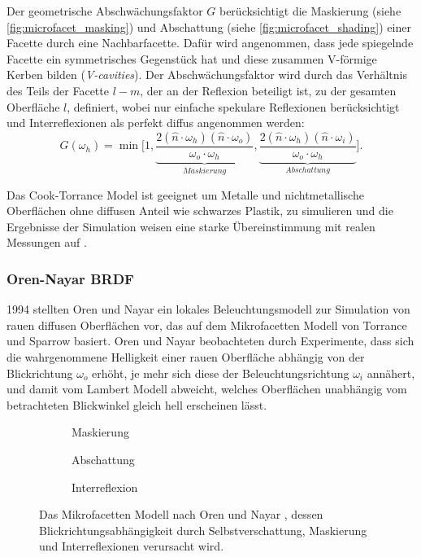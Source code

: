 \documentclass[thesis.tex]{subfiles}
\begin{document}
Der geometrische Abschwächungsfaktor $G$ berücksichtigt die Maskierung (siehe \autoref{fig:microfacet_masking}) und Abschattung (siehe \autoref{fig:microfacet_shading}) einer Facette durch eine Nachbarfacette. Dafür wird angenommen, dass jede spiegelnde Facette ein symmetrisches Gegenstück hat und diese zusammen V-förmige Kerben bilden (\emph{V-cavities}). Der Abschwächungsfaktor wird durch das Verhältnis des Teils der Facette $l-m$, der an der Reflexion beteiligt ist, zu der gesamten Oberfläche $l$, definiert, wobei nur einfache spekulare Reflexionen berücksichtigt und Interreflexionen als perfekt diffus angenommen werden: 
\begin{equation}
G(\omega_h) = \min\Big[1, \underbrace{\frac{2(\hat n \cdot \omega_h)(\hat n \cdot \omega_o)}{\omega_o \cdot \omega_h}}_{Maskierung}, \underbrace{\frac{2(\hat n \cdot \omega_h)(\hat n \cdot \omega_i)}{\omega_o \cdot \omega_h}}_{Abschattung}\Big].
\end{equation}

Das Cook-Torrance Model ist geeignet um Metalle und nichtmetallische Oberflächen ohne diffusen Anteil wie schwarzes Plastik, zu simulieren und die Ergebnisse der Simulation weisen eine starke Übereinstimmung mit realen Messungen auf \cite{bib:TorranceSparrow1967}.

\subsubsection{Oren-Nayar BRDF}

1994 stellten Oren und Nayar \cite{bib:OrenNayar1994} ein lokales Beleuchtungsmodell zur Simulation von rauen diffusen Oberflächen vor, das auf dem Mikrofacetten Modell von Torrance und Sparrow basiert. Oren und Nayar beobachteten durch Experimente, dass sich die wahrgenommene Helligkeit einer rauen Oberfläche abhängig von der Blickrichtung $\omega_o$ erhöht, je mehr sich diese der Beleuchtungsrichtung $\omega_i$ annähert, und damit vom Lambert Modell abweicht, welches Oberflächen unabhängig vom betrachteten Blickwinkel gleich hell erscheinen lässt.

\begin{figure}[h]
\centering
\begin{subfigure}[b]{0.30\textwidth}
\centering
{}
\caption{Maskierung}
\label{fig:oren_nayar_masking}
\end{subfigure}
\begin{subfigure}[b]{0.30\textwidth}
\centering
{}
\caption{Abschattung}
\label{fig:oren_nayar_shading}
\end{subfigure}
\begin{subfigure}[b]{0.30\textwidth}
\centering
{}
\caption{Interreflexion}
\label{fig:oren_nayar_interreflection}
\end{subfigure}
\caption{Das Mikrofacetten Modell nach Oren und Nayar \cite{bib:OrenNayar1994}, dessen Blickrichtungsabhängigkeit durch Selbstverschattung, Maskierung und Interreflexionen verursacht wird.}
\label{fig:oren_nayar_model}
\end{figure}
\end{document}
